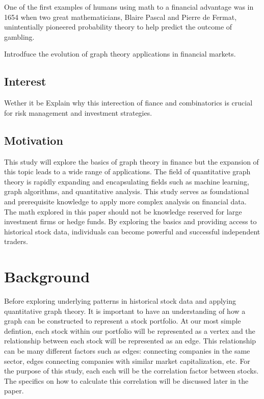 \documentclass{article}
\begin{document}
One of the first examples of humans using math to a financial advantage was in 1654 when two great mathematicians, Blaire Pascal and Pierre de Fermat, unintentially pioneered probability theory to help predict the outcome of gambling. 

Introdfuce the evolution of graph theory applications in financial markets. 

\subsection{Interest}

Wether it be Explain why this interection of fiance and combinatorics is crucial for risk management and investment strategies.


\subsection{Motivation}

This study will explore the basics of graph theory in finance but the expansion of this topic leads to a wide range of applications. The field of quantitative graph theory is rapidly expanding and encapsulating fields such as machine learning, graph algorithms, and quantitative analysis. This study serves as foundational and prerequisite knowledge to apply more complex analysis on financial data.
The math explored in this paper should not be knowledge reserved for large investment firms or hedge funds. By exploring the basics and providing  access to historical stock data, individuals can become powerful and successful independent traders.


\section{Background}

Before exploring underlying patterns in historical stock data and applying quantitative graph theory. It is important to have an understanding of how a graph can be constructed to represent a stock portfolio. At our most simple defintion, each stock within our portfolio will be represented as a vertex and the relationship between each stock will be represented as an edge. This relationship can be many different factors such as edges: connecting companies in the same sector, edges connecting companies with similar market capitalization, etc. For the purpose of this study, each each will be the correlation factor between stocks. The specifics on how to calculate this correlation will be discussed later in the paper.
\end{document}
